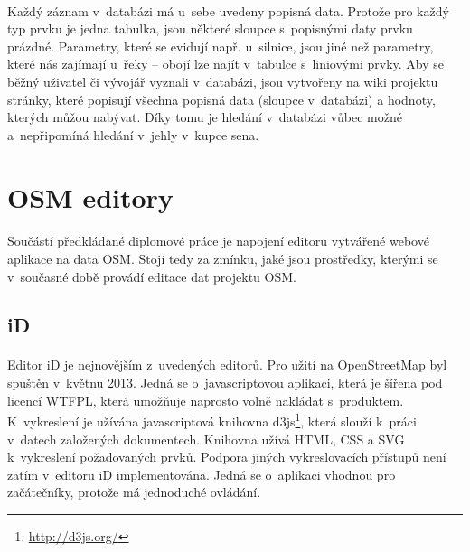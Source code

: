 \documentclass[11pt,a4paper,titlepage,oneside]{book}
\begin{document}

	\paragraph{}Každý záznam v~databázi má u~sebe uvedeny popisná data. Protože pro každý typ prvku je jedna tabulka, jsou některé sloupce s~popisnými daty prvku prázdné. Parametry, které se evidují např. u~silnice, jsou jiné než parametry, které nás zajímají u~řeky -- obojí lze najít v~tabulce s~liniovými prvky. Aby se běžný uživatel či vývojář vyznali v~databázi, jsou vytvořeny na wiki projektu stránky, které popisují všechna popisná data (sloupce v~databázi) a hodnoty, kterých můžou nabývat. Díky tomu je hledání v~databázi vůbec možné a~nepřipomíná hledání v~jehly v~kupce sena.


	\section{OSM editory} %
		\label{sec:editory}
		\paragraph{} Součástí předkládané diplomové práce je napojení editoru vytvářené web\-ové aplikace na data \ac{OSM}. Stojí tedy za zmínku, jaké jsou prostředky, kterými se v~současné době provádí editace dat projektu \ac{OSM}. 
		\subsection{iD}



			\paragraph{}Editor iD je nejnovějším z~uvedených editorů. Pro užití na OpenStreetMap byl spuštěn v~květnu 2013. Jedná se o~javascriptovou aplikaci, která je šířena pod licencí \ac{WTFPL}\cite{wiki_wtfpl}, která umožňuje naprosto volně nakládat s~produktem. K~vykreslení je užívána javascriptová knihovna d3js\footnote{\url{http://d3js.org/}}, která slouží k~práci v~datech založených dokumentech. Knihovna užívá \ac{HTML}, \ac{CSS} a \ac{SVG} k~vykreslení požadovaných prvků. Podpora jiných vykreslovacích přístupů není zatím v~editoru iD implementována. Jedná se o~aplikaci vhodnou pro začátečníky, protože má jednoduché ovládání.
\end{document}
